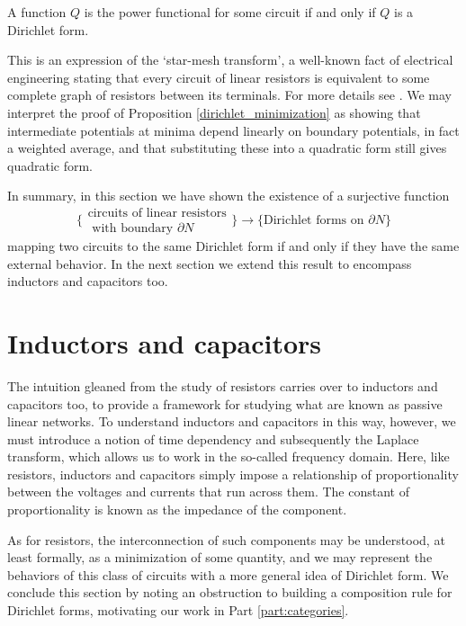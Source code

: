 \begin{proposition}
  A function $Q$ is the power functional for some circuit if and only if $Q$ is a
  Dirichlet form.
\end{proposition}

This is an expression of the `star-mesh transform', a well-known fact of
electrical engineering stating that every circuit of linear resistors is
equivalent to some complete graph of resistors between its terminals. For more
details see \cite{vLO}. We may interpret the proof of Proposition
\ref{dirichlet_minimization} as showing that intermediate potentials at minima
depend linearly on boundary potentials, in fact a weighted average, and that
substituting these into a quadratic form still gives quadratic form.

\bigskip

In summary, in this section we have shown the existence of a surjective function
\[
  \bigg\{\begin{array}{c} \mbox{circuits of linear resistors} \\ \mbox{ with
    boundary $\partial N$} \end{array} \bigg\} \longrightarrow \bigg\{
    \mbox{Dirichlet forms on $\partial N$}\bigg\}
\]
mapping two circuits to the same Dirichlet form if and only if they have the same
external behavior.  In the next section we extend this result to encompass
inductors and capacitors too.


\section{Inductors and capacitors} \label{sec:plcs}
The intuition gleaned from the study of resistors carries over to inductors and
capacitors too, to provide a framework for studying what are known as passive
linear networks. To understand inductors and capacitors in this way, however, we
must introduce a notion of time dependency and subsequently the Laplace
transform, which allows us to work in the so-called frequency domain. Here, like
resistors, inductors and capacitors simply impose a relationship of
proportionality between the voltages and currents that run across them. The
constant of proportionality is known as the impedance of the component.

As for resistors, the interconnection of such components may be understood, at
least formally, as a minimization of some quantity, and we may represent the
behaviors of this class of circuits with a more general idea of Dirichlet form.
We conclude this section by noting an obstruction to building a composition rule
for Dirichlet forms, motivating our work in Part \ref{part:categories}.



